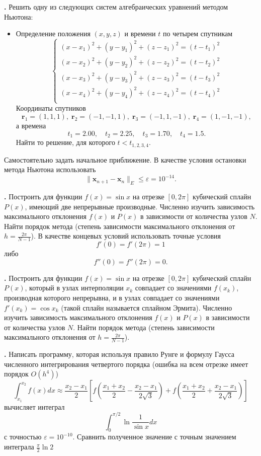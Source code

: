 \documentclass[12pt]{article}
\newcounter{task}
\newcommand{\problem}{\par\textbf{\stepcounter{task}\thetask. }}
\begin{document}
\problem Решить одну из следующих систем алгебраических уравнений методом Ньютона:
\begin{itemize}
\item Определение положения $(x,y,z)$ и времени $t$ по четырем спутникам
\[\left\{
\begin{aligned}
(x - x_1)^2 + (y - y_1)^2 + (z - z_1)^2 = (t - t_1)^2\\
(x - x_2)^2 + (y - y_2)^2 + (z - z_2)^2 = (t - t_2)^2\\
(x - x_3)^2 + (y - y_3)^2 + (z - z_3)^2 = (t - t_3)^2\\
(x - x_4)^2 + (y - y_4)^2 + (z - z_4)^2 = (t - t_4)^2\\
\end{aligned}
\right.
\]
Координаты спутников 
$$
\mathbf r_1 = (1, 1, 1), \;
\mathbf r_2 = (-1, -1, 1), \;
\mathbf r_3 = (-1, 1, -1), \;
\mathbf r_4 = (1, -1, -1),
$$
а времена 
$$
t_1 = 2.00, \quad t_2 = 2.25, \quad t_3 = 1.70, \quad t_4 = 1.5.
$$
Найти то решение, для которого $t < t_{1,2,3,4}$.
\end{itemize}
Самостоятельно задать начальное приближение. В качестве условия остановки метода Ньютона использовать
$$
\|\mathbf x_{n+1} - \mathbf x_{n}\|_E \leqslant \varepsilon = 10^{-14}.
$$

\problem Построить для функции $f(x) = \sin x$ на отрезке $[0, 2\pi]$ кубический
сплайн $P(x)$, имеющий две непрерывные производные. Численно изучить зависимость
максимального отклонения $f(x)$ и $P(x)$ в зависимости от количества узлов $N$.
Найти порядок метода (степень зависимости максимального отклонения от
$h = \frac{2\pi}{N - 1}$). В качестве концевых условий использовать точные
условия
\[
f'(0) = f'(2\pi) = 1
\]
либо
\[
f''(0) = f''(2\pi) = 0.
\]

\problem Построить для функции $f(x) = \sin x$ на отрезке $[0, 2\pi]$ кубический
сплайн $P(x)$, который в узлах интерполяции $x_k$ совпадает со значениями $f(x_k)$,
производная которого непрерывна, и в узлах совпадает со значениями $f'(x_k) =
\cos x_k$ (такой сплайн называется сплайном Эрмита). Численно изучить зависимость
максимального отклонения $f(x)$ и $P(x)$ в зависимости от количества узлов $N$.
Найти порядок метода (степень зависимости максимального отклонения от
$h = \frac{2\pi}{N - 1}$).

\problem Написать программу, которая используя правило Рунге и формулу
Гаусса численного интегрирования четвертого порядка (ошибка на всем
отрезке имеет порядок $O(h^4)$)
\[
\int_{x_1}^{x_2} f(x) dx \approx \frac{x_2 - x_1}{2}\left[
f\left(\frac{x_1+x_2}{2} - \frac{x_2 - x_1}{2\sqrt{3}}\right) +
f\left(\frac{x_1+x_2}{2} + \frac{x_2 - x_1}{2\sqrt{3}}\right)
\right]
\]
вычисляет интеграл
\[
\int_0^{\pi/2} \ln \frac{1}{\sin x} dx
\]
с точностью $\varepsilon = 10^{-10}$. Сравнить полученное значение с точным
значением интеграла $\frac{\pi}{2} \ln 2$
\end{document}
